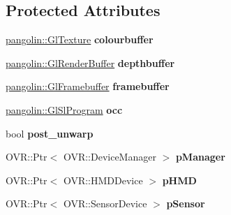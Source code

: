 \subsection*{Protected Attributes}
\begin{DoxyCompactItemize}
\item 
\hyperlink{classpangolin_1_1_gl_texture}{pangolin\+::\+Gl\+Texture} {\bfseries colourbuffer}\hypertarget{classpangolin_1_1_oculus_hud_ad0cd74bddbfbc4bbeadd81e7760deb75}{}\label{classpangolin_1_1_oculus_hud_ad0cd74bddbfbc4bbeadd81e7760deb75}

\item 
\hyperlink{structpangolin_1_1_gl_render_buffer}{pangolin\+::\+Gl\+Render\+Buffer} {\bfseries depthbuffer}\hypertarget{classpangolin_1_1_oculus_hud_a1564a899d2e2495ddcdc10034288297f}{}\label{classpangolin_1_1_oculus_hud_a1564a899d2e2495ddcdc10034288297f}

\item 
\hyperlink{structpangolin_1_1_gl_framebuffer}{pangolin\+::\+Gl\+Framebuffer} {\bfseries framebuffer}\hypertarget{classpangolin_1_1_oculus_hud_ac10d425452278fdc229b540ba8d119cf}{}\label{classpangolin_1_1_oculus_hud_ac10d425452278fdc229b540ba8d119cf}

\item 
\hyperlink{classpangolin_1_1_gl_sl_program}{pangolin\+::\+Gl\+Sl\+Program} {\bfseries occ}\hypertarget{classpangolin_1_1_oculus_hud_a540a8535d6268ce0540364e855f9a481}{}\label{classpangolin_1_1_oculus_hud_a540a8535d6268ce0540364e855f9a481}

\item 
bool {\bfseries post\+\_\+unwarp}\hypertarget{classpangolin_1_1_oculus_hud_a6e5868da547b481215fb41f148724b23}{}\label{classpangolin_1_1_oculus_hud_a6e5868da547b481215fb41f148724b23}

\item 
O\+V\+R\+::\+Ptr$<$ O\+V\+R\+::\+Device\+Manager $>$ {\bfseries p\+Manager}\hypertarget{classpangolin_1_1_oculus_hud_ab7d20ae316c5357fbf7db0207def720a}{}\label{classpangolin_1_1_oculus_hud_ab7d20ae316c5357fbf7db0207def720a}

\item 
O\+V\+R\+::\+Ptr$<$ O\+V\+R\+::\+H\+M\+D\+Device $>$ {\bfseries p\+H\+MD}\hypertarget{classpangolin_1_1_oculus_hud_a795539bbc027b24eaa811c7580f9b7ac}{}\label{classpangolin_1_1_oculus_hud_a795539bbc027b24eaa811c7580f9b7ac}

\item 
O\+V\+R\+::\+Ptr$<$ O\+V\+R\+::\+Sensor\+Device $>$ {\bfseries p\+Sensor}\hypertarget{classpangolin_1_1_oculus_hud_aeb13baa12019e3716ba7cbe2baaba3b1}{}\label{classpangolin_1_1_oculus_hud_aeb13baa12019e3716ba7cbe2baaba3b1}


\end{DoxyCompactItemize}
